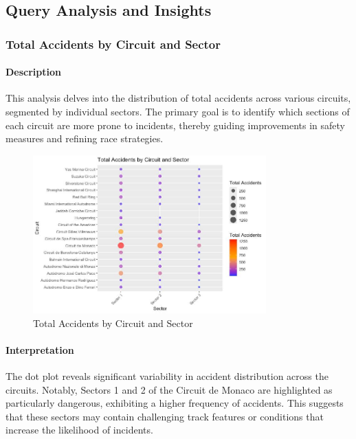 \documentclass{article}
\begin{document}
\subsection{Query Analysis and Insights}

\subsubsection{Total Accidents by Circuit and Sector}

\paragraph{Description}
This analysis delves into the distribution of total accidents across various circuits, segmented by individual sectors. The primary goal is to identify which sections of each circuit are more prone to incidents, thereby guiding improvements in safety measures and refining race strategies.

\begin{figure}[H]
    \centering
    \includegraphics[width=0.8\textwidth]{images/querie/accidentsByCircuitSector.jpeg}
    \caption{Total Accidents by Circuit and Sector}
\end{figure}

\paragraph{Interpretation}
The dot plot reveals significant variability in accident distribution across the circuits. Notably, Sectors 1 and 2 of the Circuit de Monaco are highlighted as particularly dangerous, exhibiting a higher frequency of accidents. This suggests that these sectors may contain challenging track features or conditions that increase the likelihood of incidents. 
\end{document}
